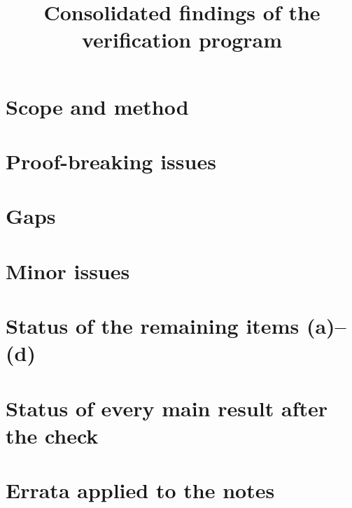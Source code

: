 \documentclass[11pt]{article}
\title{Consolidated findings of the verification program}\author{}\date{}
\begin{document}
\maketitle
\section{Scope and method}
\section{Proof-breaking issues}
\section{Gaps}
\section{Minor issues}
\section{Status of the remaining items (a)--(d)}
\section{Status of every main result after the check}
\section{Errata applied to the notes}
\end{document}

